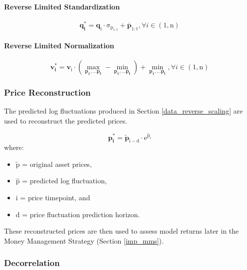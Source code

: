 \documentclass[a4paper,11pt,oneside]{article}
\theoremstyle{plain}
\theoremstyle{definition}
\begin{document}
	\paragraph{Reverse Limited Standardization}
	
	\begin{equation}
	\mathbf{q^{*}_i} = \mathrm{{\mathbf{q}_i} \cdot \sigma_{p_{1:t}} + \bar{\mathbf{p}}_{1:t}},  \forall  i \in (1, \mathrm{n})
	\end{equation}
	
	\paragraph{Reverse Limited Normalization}
	
	\begin{equation}
	\mathbf{v^{*}_i} = \mathrm{\mathbf{v}_i \cdot \left(\max\limits_{\mathbf{p_1},\dots\mathbf{p_t}} - \min\limits_{\mathbf{p_1},\dots\mathbf{p_t}}\right) + \min\limits_{\mathbf{p_1},\dots\mathbf{p_t}}},  \forall  i \in (1, \mathrm{n})
	\end{equation}
	
	
	\subsubsection{Price Reconstruction}\label{data_price_recon}
	
	The predicted log fluctuations produced in Section \ref{data_reverse_scaling} are used to reconstruct the predicted prices. 
	
	\begin{equation}\label{eq_price_recon}
	\mathbf{p^*_i} = \mathrm{\tilde{\mathbf{p}}_{i-d} \cdot e^{\hat{p}_{i}}}
	\end{equation}
	where:
	\begin{itemize}
		\item [] $\mathrm{\tilde{p}}$ = original asset prices,
		\item [] $\mathrm{\hat{p}}$ = predicted log fluctuation,
		\item [] $\mathrm{i}$ = price timepoint, and 
		\item [] $\mathrm{d}$ = price fluctuation prediction horizon.
		
	\end{itemize}
	\texttt{}\newline
	These reconstructed prices are then used to assess model returns later in the Money Management Strategy (Section \ref{imp_mms}).
	
	\subsubsection{Decorrelation}
	
\end{document}
